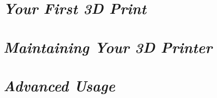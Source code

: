\documentclass[twoside,12pt,openright,final,english]{memoir}
\newif\ifslicer\slicerfalse %
\newif\ifglcd\glcdfalse %
\newif\ifmaintenance\maintenancetrue %
\newif\iffaq\faqfalse %
\newif\iftroubleshooting\troubleshootingfalse %
\begin{document}
\chapter{\emph{Your First 3D Print}}
\label{firstprint}
\thispagestyle{empty}
{
\fi

\ifslicer
\chapter{\emph{Slic3r}}
\thispagestyle{empty}
\markboth{Slic3r}{LulzBot Mini User Manual}
{}
\fi

\ifglcd
\chapter{\emph{Printing with the Graphic LCD}}
\label{glcd}
\thispagestyle{empty}
\markboth{Printing with the Graphic LCD}{LulzBot Mini User Manual}
{}
\fi

\ifmaintenance
\chapter{\emph{Maintaining Your 3D Printer}}
\thispagestyle{empty}
{}
\fi

\ifmaintenance
\chapter{\emph{Advanced Usage}}
\thispagestyle{empty}
{}
\fi

\iffaq
\chapter{\emph{FAQ}}
\thispagestyle{empty}
\markboth{FAQ}{LulzBot Mini User Manual}
{}
\fi

\iftroubleshooting
\chapter{\emph{Troubleshooting}}
\thispagestyle{empty}
\markboth{Troubleshooting}{LulzBot Mini User Manual}
{}
\fi

}
\end{document}
